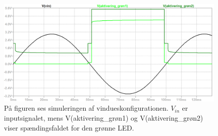 \begin{figure}[H]
	\centering
	\includegraphics[scale=0.36]{figures/cProblemloesning/vindues_konfiguration.PNG}
	\caption{På figuren ses simuleringen af vindueskonfigurationen. $V_{in}$ er inputsignalet, mens V(aktivering\_grøn1) og V(aktivering\_grøn2) viser spændingsfaldet for den grønne LED.}
	\label{fig:vindues_konfiguration}
\end{figure}

